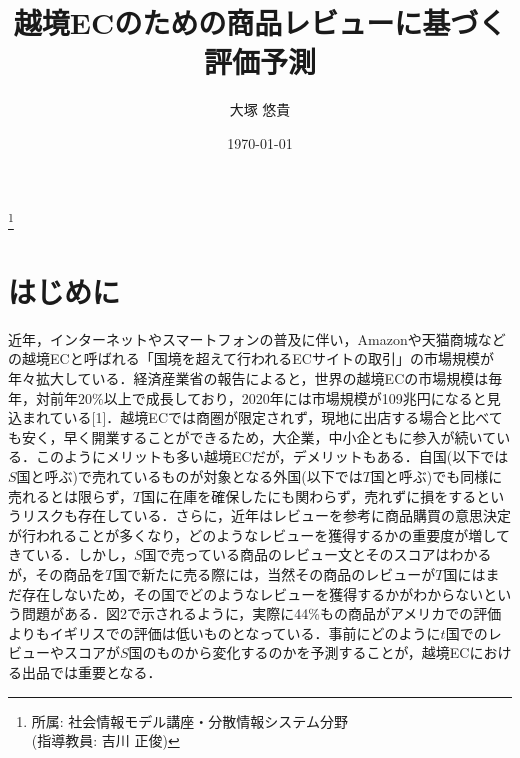 \documentclass[dvipdfmx,twocolumn,10.5pt]{jsarticle}
\title{越境ECのための商品レビューに基づく評価予測}
\author{大塚 悠貴}
\date{\today}
\begin{document}

\footnote[0]{所属: 社会情報モデル講座・分散情報システム分野\\(指導教員: 吉川 正俊)}

\section{はじめに}
近年，インターネットやスマートフォンの普及に伴い，Amazonや天猫商城などの越境ECと呼ばれる「国境を超えて行われるECサイトの取引」の市場規模が年々拡大している．経済産業省の報告によると，世界の越境ECの市場規模は毎年，対前年$20\%$以上で成長しており，2020年には市場規模が109兆円になると見込まれている[1]．越境ECでは商圏が限定されず，現地に出店する場合と比べても安く，早く開業することができるため，大企業，中小企ともに参入が続いている．このようにメリットも多い越境ECだが，デメリットもある．自国(以下では$S$国と呼ぶ)で売れているものが対象となる外国(以下では$T$国と呼ぶ)でも同様に売れるとは限らず，$T$国に在庫を確保したにも関わらず，売れずに損をするというリスクも存在している．さらに，近年はレビューを参考に商品購買の意思決定が行われることが多くなり，どのようなレビューを獲得するかの重要度が増してきている．しかし，$S$国で売っている商品のレビュー文とそのスコアはわかるが，その商品を$T$国で新たに売る際には，当然その商品のレビューが$T$国にはまだ存在しないため，その国でどのようなレビューを獲得するかがわからないという問題がある．図2で示されるように，実際に44\%もの商品がアメリカでの評価よりもイギリスでの評価は低いものとなっている．事前にどのように$t$国でのレビューやスコアが$S$国のものから変化するのかを予測することが，越境ECにおける出品では重要となる．
\end{document}
